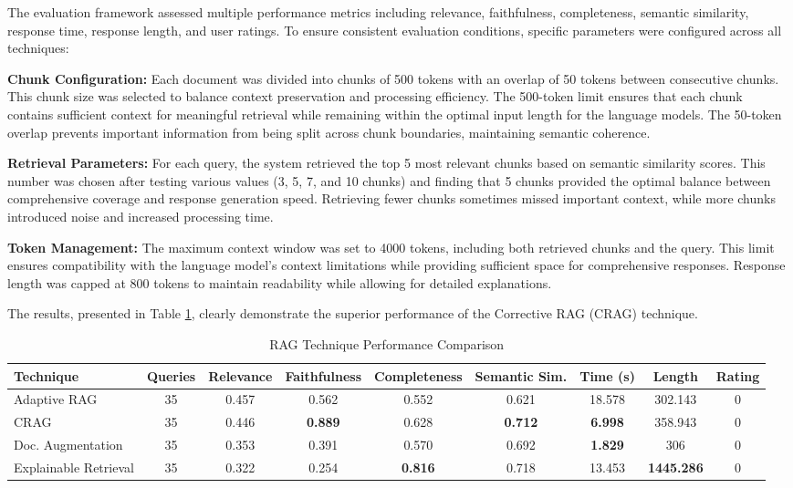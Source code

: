 \documentclass[12pt,a4paper]{article}
\begin{document}
The evaluation framework assessed multiple performance metrics including relevance, faithfulness, completeness, semantic similarity, response time, response length, and user ratings. To ensure consistent evaluation conditions, specific parameters were configured across all techniques:

\textbf{Chunk Configuration:} Each document was divided into chunks of 500 tokens with an overlap of 50 tokens between consecutive chunks. This chunk size was selected to balance context preservation and processing efficiency. The 500-token limit ensures that each chunk contains sufficient context for meaningful retrieval while remaining within the optimal input length for the language models. The 50-token overlap prevents important information from being split across chunk boundaries, maintaining semantic coherence.

\textbf{Retrieval Parameters:} For each query, the system retrieved the top 5 most relevant chunks based on semantic similarity scores. This number was chosen after testing various values (3, 5, 7, and 10 chunks) and finding that 5 chunks provided the optimal balance between comprehensive coverage and response generation speed. Retrieving fewer chunks sometimes missed important context, while more chunks introduced noise and increased processing time.

\textbf{Token Management:} The maximum context window was set to 4000 tokens, including both retrieved chunks and the query. This limit ensures compatibility with the language model's context limitations while providing sufficient space for comprehensive responses. Response length was capped at 800 tokens to maintain readability while allowing for detailed explanations.

The results, presented in Table \ref{tab:rag_comparison}, clearly demonstrate the superior performance of the Corrective RAG (CRAG) technique.

\begin{table}[H]
\centering
\caption{RAG Technique Performance Comparison}
\label{tab:rag_comparison}
\small
\begin{tabular}{@{}p{2.5cm}cccccccc@{}}
\toprule
\textbf{Technique} & \textbf{Queries} & \textbf{Relevance} & \textbf{Faithfulness} & \textbf{Completeness} & \textbf{Semantic Sim.} & \textbf{Time (s)} & \textbf{Length} & \textbf{Rating} \\
\midrule
Adaptive RAG & 35 & 0.457 & 0.562 & 0.552 & 0.621 & 18.578 & 302.143 & 0 \\
CRAG & 35 & 0.446 & \textbf{0.889} & 0.628 & \textbf{0.712} & \textbf{6.998} & 358.943 & 0 \\
Doc. Augmentation & 35 & 0.353 & 0.391 & 0.570 & 0.692 & \textbf{1.829} & 306 & 0 \\
Explainable Retrieval & 35 & 0.322 & 0.254 & \textbf{0.816} & 0.718 & 13.453 & \textbf{1445.286} & 0 \\
\bottomrule
\end{tabular}
\end{table}
\end{document}
